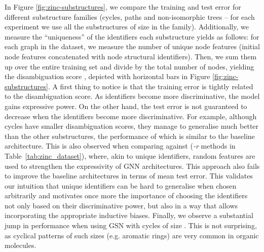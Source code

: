 \documentclass{article} \usepackage{iclr2021_conference,times}
\begin{document}
In Figure \ref{fig:zinc-substructures}, we compare the training and test error for different substructure families (cycles, paths and non-isomorphic trees -- for each experiment we use all the substructures of size  in the family). Additionally, we measure the ``uniqueness'' of the identifiers each substructure yields as follows: for each graph  in the dataset, we measure the number of unique node features  (initial node features concatenated with node structural identifiers). Then, we sum them up over the entire training set and divide by the total number of nodes, yielding the disambiguation score , depicted with horizontal bars in Figure \ref{fig:zinc-substructures}.  A first thing to notice is that the training error is tightly related to the disambiguation score. As identifiers become more discriminative, the model gains expressive power. On the other hand, the test error is not guaranteed to decrease when the identifiers become more discriminative. For example, although cycles have smaller disambiguation scores, they manage to generalise much better than the other substructures, the performance of which is similar to the baseline architecture. This is also observed when comparing against \cite{sato2020random} (\textit{-r} methods in Table~\ref{tab:zinc_dataset}), where, akin to unique identifiers, random features are used to strengthen the expressivity of GNN architectures. This approach also fails to improve the baseline architectures in terms of mean test error. This validates our intuition that unique identifiers can be hard to generalise when chosen arbitrarily and motivates once more the importance of choosing the identifiers not only based on their discriminative power, but also in a way that allows incorporating the appropriate inductive biases. Finally, we observe a substantial jump in performance when using GSN with cycles of size . This is not surprising, as cyclical patterns of such sizes (e.g. aromatic rings) are very common in organic molecules.
\end{document}
